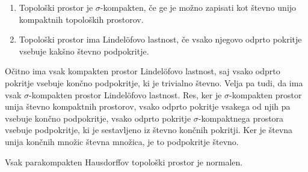 \documentclass[mat1]{fmfdelo}
\begin{document}
\begin{definicija}
\begin{enumerate}
\item Topološki prostor je $\sigma$-kompakten, če ge je možno zapisati kot števno unijo kompaktnih topoloških prostorov.
\item Topološki prostor ima Lindel\"ofovo lastnost, če vsako njegovo odprto pokritje vsebuje kakšno števno podpokritje.
\end{enumerate}
\end{definicija}

Očitno ima vsak kompakten prostor Lindel\"ofovo lastnost, saj vsako odprto pokritje vsebuje končno podpokritje, ki je trivialno števno. Velja pa tudi, da ima vsak $\sigma$-kompakten prostor Lindel\"ofovo lastnost. Res, ker je $\sigma$-kompakten prostor unija števno kompaktnih prostorov, vsako odprto pokritje vsakega od njih pa vsebuje končno podpokritje, vsako odprto pokritje $\sigma$-kompaktnega prostora vsebuje pod\-pok\-rit\-je, ki je sestavljeno iz števno končnih pokritji. Ker je števna unija končnih množic števna množica, je to podpokritje števno.

\begin{trditev}\label{trd:parkompnorm} %
Vsak parakompakten Hausdorffov topološki prostor je normalen.
\end{trditev}
\end{document}
